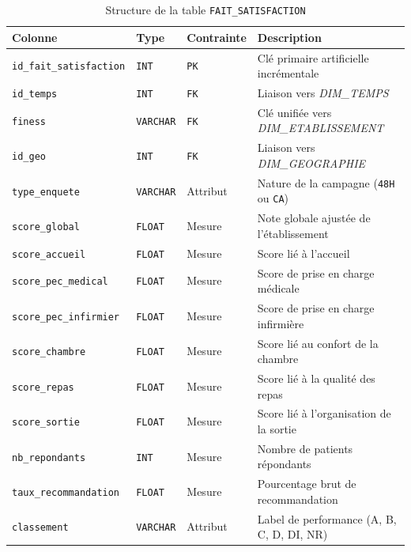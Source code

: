 \documentclass[12pt, a4paper]{report}
\begin{document}
\begin{itemize}[label=\textcolor{chuBlue}{\textbullet}]
\begin{table}[htbp]
\centering\footnotesize\renewcommand{\arraystretch}{1.4}
\begin{tabularx}{\linewidth}{@{} L{3.6cm} L{1.5cm} L{2.0cm} X @{}}
\toprule
{}
\textbf{Colonne} & \textbf{Type} & \textbf{Contrainte} & \textbf{Description} \\
\midrule
\texttt{id\_fait\_satisfaction} & \texttt{INT} & \texttt{PK} & Clé primaire artificielle incrémentale \\
\texttt{id\_temps} & \texttt{INT} & \texttt{FK} & Liaison vers \textit{DIM\_TEMPS} \\
\texttt{finess} & \texttt{VARCHAR} & \texttt{FK} & Clé unifiée vers \textit{DIM\_ETABLISSEMENT} \\
\texttt{id\_geo} & \texttt{INT} & \texttt{FK} & Liaison vers \textit{DIM\_GEOGRAPHIE} \\
\texttt{type\_enquete} & \texttt{VARCHAR} & Attribut & Nature de la campagne (\texttt{48H} ou \texttt{CA}) \\
\texttt{score\_global} & \texttt{FLOAT} & Mesure & Note globale ajustée de l'établissement \\
\texttt{score\_accueil} & \texttt{FLOAT} & Mesure & Score lié à l'accueil \\
\texttt{score\_pec\_medical} & \texttt{FLOAT} & Mesure & Score de prise en charge médicale \\
\texttt{score\_pec\_infirmier} & \texttt{FLOAT} & Mesure & Score de prise en charge infirmière \\
\texttt{score\_chambre} & \texttt{FLOAT} & Mesure & Score lié au confort de la chambre \\
\texttt{score\_repas} & \texttt{FLOAT} & Mesure & Score lié à la qualité des repas \\
\texttt{score\_sortie} & \texttt{FLOAT} & Mesure & Score lié à l'organisation de la sortie \\
\texttt{nb\_repondants} & \texttt{INT} & Mesure & Nombre de patients répondants \\
\texttt{taux\_recommandation} & \texttt{FLOAT} & Mesure & Pourcentage brut de recommandation \\
\texttt{classement} & \texttt{VARCHAR} & Attribut & Label de performance (A, B, C, D, DI, NR) \\
\bottomrule
\end{tabularx}
\caption{Structure de la table \texttt{FAIT\_SATISFACTION}}
\label{tab:fait_satisfaction}
\end{table}


\end{itemize}
\end{document}
